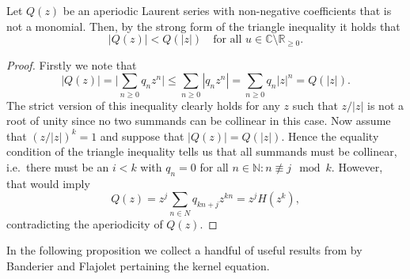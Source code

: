 \begin{lemma} \label{lemma:strong_triangle_inequality}
  Let $Q(z)$ be an aperiodic Laurent series with non-negative coefficients that is not a monomial. Then, by the strong form of the triangle inequality it holds that
  $$
    |Q(z)| < Q(|z|)\quad \text{for all $u \in \mathbb{C}\setminus \mathbb{R}_{\geq 0}$}.
  $$
\end{lemma}

\begin{proof}
  Firstly we note that
  $$ |Q(z)| = \Big|\sum_{n \geq 0}q_n z^n\Big| \leq \sum_{n \geq 0}|q_n z^n| = \sum_{n \geq 0}q_n|z|^n = Q(|z|).
  $$
  The strict version of this inequality clearly holds for any $z$ such that $z/|z|$ is not a root of unity since no two summands can be collinear in this case.
  Now assume that $(z/|z|)^k = 1$ and suppose that $|Q(z)| = Q(|z|)$. Hence the equality condition of the triangle inequality tells us that all summands must be collinear, i.e.~there must be an $i < k$ with $q_n = 0$ for all $n \in \mathbb{N}: n \not\equiv j \mod k$. However, that would imply
  $$
    Q(z) = z^j\sum_{n \in N}q_{k n + j}z^{k n} = z^jH(z^k),
  $$
  contradicting the aperiodicity of $Q(z)$.
\end{proof}

In the following proposition we collect a handful of useful results from \cite{Basic} by Banderier and Flajolet pertaining the kernel equation. 

